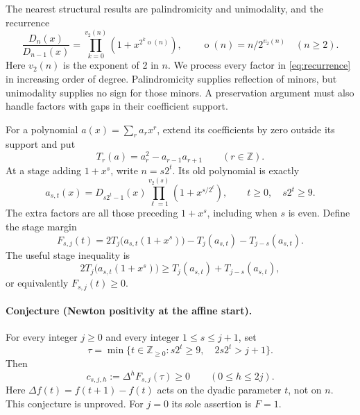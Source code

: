 \documentclass[11pt]{article}
\newcommand{\Z}{\mathbb Z}
\DeclareMathOperator{\odd}{o}
\begin{document}
The nearest structural results are palindromicity and unimodality, and
the recurrence \cite[Propositions 3.9--3.10]{BBFM}
\begin{equation}\label{eq:recurrence}
 \frac{D_n(x)}{D_{n-1}(x)}=
 \prod_{k=0}^{v_2(n)}(1+x^{2^k\odd(n)}),\qquad
 \odd(n)=n/2^{v_2(n)}\quad(n\geq2).
\end{equation}
Here $v_2(n)$ is the exponent of 2 in $n$. We process every factor in
\eqref{eq:recurrence} in increasing order of degree. Palindromicity
supplies reflection of minors, but unimodality supplies no sign for those
minors. A preservation argument must also handle factors with gaps in
their coefficient support.

For a polynomial $a(x)=\sum_r a_rx^r$, extend its coefficients by zero
outside its support and put
\[
 T_r(a)=a_r^2-a_{r-1}a_{r+1}\qquad(r\in\Z).
\]
At a stage adding $1+x^s$, write $n=s2^t$. Its old polynomial is exactly
\begin{equation}\label{eq:a}
 a_{s,t}(x)=D_{s2^t-1}(x)
       \prod_{\ell=1}^{v_2(s)}(1+x^{s/2^\ell}),
 \qquad t\geq0,\quad s2^t\geq9.
\end{equation}
The extra factors are all those preceding $1+x^s$, including when $s$ is
even. Define the stage margin
\begin{equation}\label{eq:F}
 F_{s,j}(t)=2T_j\bigl(a_{s,t}(1+x^s)\bigr)
                   -T_j(a_{s,t})-T_{j-s}(a_{s,t}).
\end{equation}
The useful stage inequality is
\begin{equation}\tag{H}\label{eq:H}
 2T_j\bigl(a_{s,t}(1+x^s)\bigr)
       \geq T_j(a_{s,t})+T_{j-s}(a_{s,t}),
\end{equation}
or equivalently $F_{s,j}(t)\geq0$.

\paragraph{Conjecture (Newton positivity at the affine start).}
For every integer $j\geq0$ and every integer $1\leq s\leq j+1$, set
\begin{equation}\label{eq:tau}
 \tau=\min\{t\in\Z_{\geq0}:s2^t\geq9,\quad 2s2^t>j+1\}.
\end{equation}
Then
\begin{equation}\tag{K}\label{eq:K}
 c_{s,j,h}:=\Delta^hF_{s,j}(\tau)\geq0
       \qquad(0\leq h\leq2j).
\end{equation}
Here $\Delta f(t)=f(t+1)-f(t)$ acts on the dyadic parameter $t$, not on
$n$. This conjecture is unproved. For $j=0$ its sole assertion is $F=1$.
\end{document}
